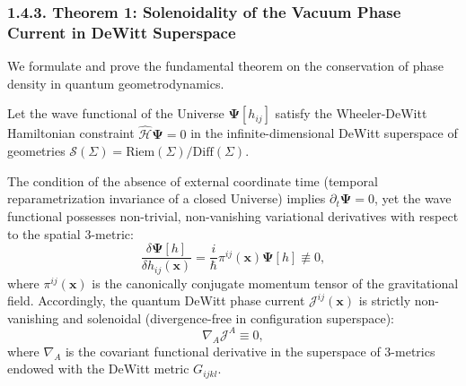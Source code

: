 \subsubsection{1.4.3. Theorem 1: Solenoidality of the Vacuum Phase Current in DeWitt Superspace}\label{sec:1.4.3}

We formulate and prove the fundamental theorem on the conservation of phase density in quantum geometrodynamics.

\begin{theorem}\label{thm:1}
Let the wave functional of the Universe $\mathbf{\Psi}[h_{ij}]$ satisfy the Wheeler-DeWitt Hamiltonian constraint $\hat{\mathcal{H}}\mathbf{\Psi} = 0$ in the infinite-dimensional DeWitt superspace of geometries $\mathcal{S}(\Sigma) = \text{Riem}(\Sigma)/\text{Diff}(\Sigma)$.

The condition of the absence of external coordinate time (temporal reparametrization invariance of a closed Universe) implies $\partial_t \mathbf{\Psi} = 0$, yet the wave functional possesses non-trivial, non-vanishing variational derivatives with respect to the spatial 3-metric:
\begin{equation}\label{eq:1.91}\tag{1.91}
\frac{\delta \mathbf{\Psi}[h]}{\delta h_{ij}(\mathbf{x})} = \frac{i}{\hbar} \pi^{ij}(\mathbf{x}) \mathbf{\Psi}[h] \not\equiv 0,
\end{equation}
where $\pi^{ij}(\mathbf{x})$ is the canonically conjugate momentum tensor of the gravitational field. Accordingly, the quantum DeWitt phase current $\mathcal{J}^{ij}(\mathbf{x})$ is strictly non-vanishing and solenoidal (divergence-free in configuration superspace):
\begin{equation}\label{eq:1.92}\tag{1.92}
\nabla_A \mathcal{J}^A \equiv 0,
\end{equation}
where $\nabla_A$ is the covariant functional derivative in the superspace of 3-metrics endowed with the DeWitt metric $G_{ijkl}$.
\end{theorem}

